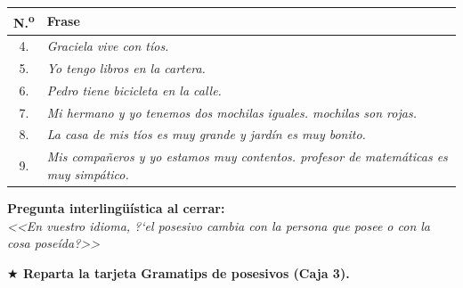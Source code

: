 \documentclass[a4paper,10pt]{article}
\renewcommand{\arraystretch}{1.3}
\begin{document}
\renewcommand{\arraystretch}{1.6}
\begin{center}
\begin{tabular}{|c p{11cm}|}
\hline
\rowcolor{purpura!8}
\textbf{N.\textsuperscript{o}} & \textbf{Frase} \\
\hline
4. & \textit{Graciela vive con \underline{\hspace{2cm}} t\'ios.} \\
\hline
5. & \textit{Yo tengo \underline{\hspace{2cm}} libros en la cartera.} \\
\hline
6. & \textit{Pedro tiene \underline{\hspace{2cm}} bicicleta en la calle.} \\
\hline
7. & \textit{Mi hermano y yo tenemos dos mochilas iguales. \underline{\hspace{2cm}} mochilas son rojas.} \\
\hline
8. & \textit{La casa de mis t\'ios es muy grande y \underline{\hspace{2cm}} jard\'in es muy bonito.} \\
\hline
9. & \textit{Mis compa\~{n}eros y yo estamos muy contentos. \underline{\hspace{2cm}} profesor de matem\'aticas es muy simp\'atico.} \\
\hline
\end{tabular}
\end{center}

\vspace{0.5cm}


\begin{awarenessbox}
\textbf{\textcolor{purpura}{Pregunta interling\"u\'istica al cerrar:}}\\[0.2cm]
\textit{<<En vuestro idioma, ?`el posesivo cambia con la persona que posee o con la cosa pose\'ida?>>}
\end{awarenessbox}

\vspace{0.4cm}

\begin{tcolorbox}[colback=dorado!10, colframe=dorado!80!black, arc=3pt, boxrule=0.8pt]
\textbf{$\bigstar$ Reparta la tarjeta Gramatips de posesivos (Caja 3).}
\end{tcolorbox}
\end{document}
